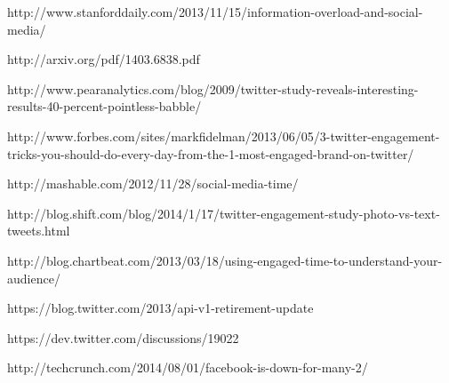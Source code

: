 \begin{thebibliography}{9}
http://www.stanforddaily.com/2013/11/15/information-overload-and-social-media/

http://arxiv.org/pdf/1403.6838.pdf

http://www.pearanalytics.com/blog/2009/twitter-study-reveals-interesting-results-40-percent-pointless-babble/

http://www.forbes.com/sites/markfidelman/2013/06/05/3-twitter-engagement-tricks-you-should-do-every-day-from-the-1-most-engaged-brand-on-twitter/

http://mashable.com/2012/11/28/social-media-time/

http://blog.shift.com/blog/2014/1/17/twitter-engagement-study-photo-vs-text-tweets.html

http://blog.chartbeat.com/2013/03/18/using-engaged-time-to-understand-your-audience/

https://blog.twitter.com/2013/api-v1-retirement-update

https://dev.twitter.com/discussions/19022


http://techcrunch.com/2014/08/01/facebook-is-down-for-many-2/
  
\end{thebibliography}


